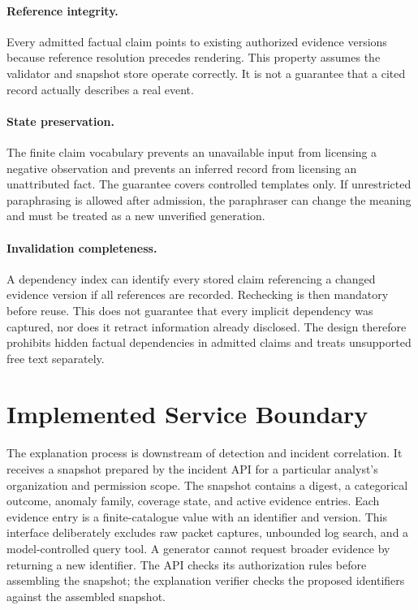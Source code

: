 \paragraph{Reference integrity.} Every admitted factual claim points to existing authorized evidence versions because reference resolution precedes rendering. This property assumes the validator and snapshot store operate correctly. It is not a guarantee that a cited record actually describes a real event.

\paragraph{State preservation.} The finite claim vocabulary prevents an unavailable input from licensing a negative observation and prevents an inferred record from licensing an unattributed fact. The guarantee covers controlled templates only. If unrestricted paraphrasing is allowed after admission, the paraphraser can change the meaning and must be treated as a new unverified generation.

\paragraph{Invalidation completeness.} A dependency index can identify every stored claim referencing a changed evidence version if all references are recorded. Rechecking is then mandatory before reuse. This does not guarantee that every implicit dependency was captured, nor does it retract information already disclosed. The design therefore prohibits hidden factual dependencies in admitted claims and treats unsupported free text separately.

\section{Implemented Service Boundary}
The explanation process is downstream of detection and incident correlation. It receives a snapshot prepared by the incident API for a particular analyst's organization and permission scope. The snapshot contains a digest, a categorical outcome, anomaly family, coverage state, and active evidence entries. Each evidence entry is a finite-catalogue value with an identifier and version. This interface deliberately excludes raw packet captures, unbounded log search, and a model-controlled query tool. A generator cannot request broader evidence by returning a new identifier. The API checks its authorization rules before assembling the snapshot; the explanation verifier checks the proposed identifiers against the assembled snapshot.

